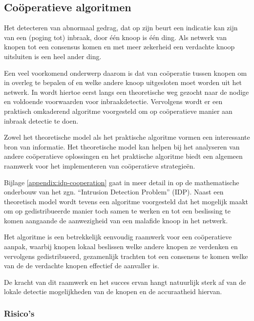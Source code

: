 \subsection{Co\"operatieve algoritmen}
\label{subsection:cooperation}

Het detecteren van abnormaal gedrag, dat op zijn beurt een indicatie kan zijn
van een (poging tot) inbraak, door \'e\'en knoop is \'e\'en ding. Als netwerk
van knopen tot een consensus komen en met meer zekerheid een verdachte knoop
uitsluiten is een heel ander ding.

Een veel voorkomend onderwerp daarom is dat van co\"operatie tussen knopen om
in overleg te bepalen of en welke andere knoop uitgesloten moet worden uit het
netwerk. In \citep{krontiris2009cooperative} wordt hiertoe eerst langs een
theoretische weg gezocht naar de nodige en voldoende voorwaarden voor
inbraakdetectie. Vervolgens wordt er een praktisch omkaderend algoritme
voorgesteld om op co\"operatieve manier aan inbraak detectie te doen.

Zowel het theoretische model als het praktische algoritme vormen een
interessante bron van informatie. Het theoretische model kan helpen bij het
analyseren van andere co\"operatieve oplossingen en het praktische algoritme
biedt een algemeen raamwerk voor het implementeren van co\"operatieve
strategie\"en.

Bijlage \ref{appendix:idp-cooperation} gaat in meer detail in op de
mathematische onderbouw van het zgn. ``Intrusion Detection Problem'' (IDP).
Naast een theoretisch model wordt tevens een algoritme voorgesteld dat het
mogelijk maakt om op gedistribueerde manier toch samen te werken en tot een
beslissing te komen aangaande de aanwezigheid van een malafide knoop in het
netwerk.

Het algoritme is een betrekkelijk eenvoudig raamwerk voor een co\"operatieve
aanpak, waarbij knopen lokaal beslissen welke andere knopen ze verdenken en
vervolgens gedistribueerd, gezamenlijk trachten tot een consensus te komen
welke van de de verdachte knopen effectief de aanvaller is.

De kracht van dit raamwerk en het succes ervan hangt natuurlijk sterk af van de
lokale detectie mogelijkheden van de knopen en de accuraatheid hiervan.

\subsubsection*{Risico's}

